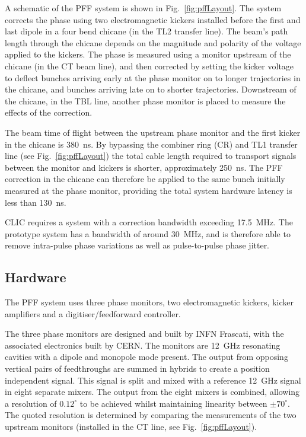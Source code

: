\documentclass[%
 reprint,
 amsmath,amssymb,
 prl,
]{revtex4-1}
\begin{document}
A schematic of the PFF system is shown in Fig.~\ref{fig:pffLayout}. The system 
corrects the phase using two electromagnetic kickers installed 
before the first and last dipole in a four bend chicane (in the TL2 transfer 
line). The beam's path length 
through the chicane depends on the magnitude and polarity of the voltage 
applied to the kickers. The phase is measured using a monitor upstream of 
the chicane (in the CT beam line), and then corrected by setting the kicker 
voltage to deflect bunches arriving early at the phase monitor on to longer 
trajectories in the chicane, and bunches arriving late on to shorter 
trajectories. Downstream of the chicane, in the TBL line, another phase monitor 
is placed to measure the effects of the correction.

The beam time of flight between the upstream phase monitor and the first kicker 
in the chicane is 380~ns. By bypassing the combiner ring (CR) and TL1 transfer 
line (see Fig.~\ref{fig:pffLayout}) the total cable length required to 
transport signals between the monitor and kickers is shorter, approximately 
250~ns. The PFF correction in the chicane can therefore be applied to the same 
bunch initially measured at the phase monitor, providing the total system 
hardware latency is less than 130~ns. 

CLIC requires a system with a correction 
bandwidth exceeding 17.5~MHz. The prototype system has a bandwidth of around 
30~MHz, and is therefore able to remove intra-pulse phase variations as well as 
pulse-to-pulse phase jitter.

\subsection{\label{ss:hardware}Hardware}

The PFF system uses three phase monitors, two electromagnetic kickers, kicker 
amplifiers and a digitiser/feedforward controller.

The three phase monitors are designed and built by INFN Frascati, with the 
associated electronics built by CERN. The monitors are 12~GHz resonating 
cavities with a dipole and monopole mode present. The output from opposing 
vertical pairs of feedthroughs are summed in hybrids to create a position 
independent signal. This signal is split and mixed with a reference 12~GHz 
signal in eight separate mixers. The output from the eight mixers is combined, 
allowing a resolution of \(0.12^\circ\) to be 
achieved whilst maintaining linearity between \(\pm70^\circ\). The quoted 
resolution 
is determined by 
comparing the measurements of the two upstream monitors (installed in the CT 
line, see Fig.~\ref{fig:pffLayout}).
\end{document}
